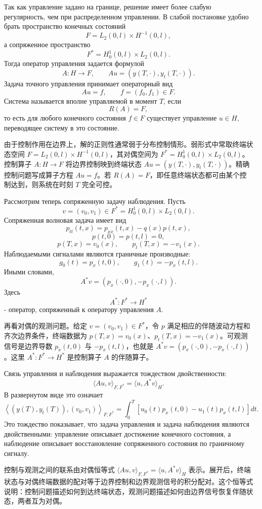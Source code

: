 \documentclass[12pt,a4paper]{article}
\newcommand{\zh}[1]{\par\noindent #1\par}
\begin{document}

Так как управление задано на границе, решение имеет более слабую регулярность, чем при распределенном управлении. В слабой постановке удобно брать пространство конечных состояний
\[
 F=L_2(0,l)\times H^{-1}(0,l),
\]
а сопряженное пространство
\[
 F^*=H_0^1(0,l)\times L_2(0,l).
\]
Тогда оператор управления задается формулой
\[
 A:H\to F,\qquad Au=(y(T,\cdot),y_t(T,\cdot)).
\]
Задача точного управления принимает операторный вид
\[
 Au=f,\qquad f=(f_0,f_1)\in F.
\]
Система называется вполне управляемой в момент $T$, если
\[
 R(A)=F,
\]
то есть для любого конечного состояния $f\in F$ существует управление $u\in H$, переводящее систему в это состояние.
\zh{由于控制作用在边界上，解的正则性通常弱于分布控制情形。弱形式中常取终端状态空间 \(F=L_2(0,l)\times H^{-1}(0,l)\)，其对偶空间为 \(F^*=H_0^1(0,l)\times L_2(0,l)\)。控制算子 \(A:H\to F\) 将边界控制映到终端状态 \(Au=(y(T,\cdot),y_t(T,\cdot))\)。精确控制问题写成算子方程 \(Au=f\)。若 \(R(A)=F\)，即任意终端状态都可由某个控制达到，则系统在时刻 \(T\) 完全可控。}

Рассмотрим теперь сопряженную задачу наблюдения. Пусть
\[
 v=(v_0,v_1)\in F^*=H_0^1(0,l)\times L_2(0,l).
\]
Сопряженная волновая задача имеет вид
\[
 p_{tt}(t,x)=p_{xx}(t,x)-q(x)p(t,x),
\]
\[
 p(t,0)=p(t,l)=0,
\]
\[
 p(T,x)=v_0(x),\qquad p_t(T,x)=-v_1(x).
\]
Наблюдаемыми сигналами являются граничные производные:
\[
 g_0(t)=p_x(t,0),\qquad g_1(t)=-p_x(t,l).
\]
Иными словами,
\[
 A^*v=(p_x(\cdot,0),-p_x(\cdot,l)).
\]
Здесь
\[
 A^*:F^*\to H^*
\]
- оператор, сопряженный к оператору управления $A$.
\zh{再看对偶的观测问题。给定 \(v=(v_0,v_1)\in F^*\)，令 \(p\) 满足相应的伴随波动方程和齐次边界条件，终端数据为 \(p(T,x)=v_0(x)\)、\(p_t(T,x)=-v_1(x)\)。可观测信号是边界导数 \(p_x(t,0)\) 与 \(-p_x(t,l)\)，也就是 \(A^*v=(p_x(\cdot,0),-p_x(\cdot,l))\)。这里 \(A^*:F^*\to H^*\) 是控制算子 \(A\) 的伴随算子。}


Связь управления и наблюдения выражается тождеством двойственности:
\[
 \langle Au,v\rangle_{F,F^*}=\langle u,A^*v\rangle_H.
\]
В развернутом виде это означает
\[
 \left\langle (y(T),y_t(T)),(v_0,v_1)\right\rangle_{F,F^*}
 =
 \int_0^T\left[u_0(t)p_x(t,0)-u_1(t)p_x(t,l)\right]dt.
\]
Это тождество показывает, что задача управления и задача наблюдения являются двойственными: управление описывает достижение конечного состояния, а наблюдение описывает восстановление сопряженного состояния по граничному сигналу.
\zh{控制与观测之间的联系由对偶恒等式 \(\langle Au,v\rangle_{F,F^*}=\langle u,A^*v\rangle_H\) 表示。展开后，终端状态与对偶终端数据的配对等于边界控制和边界观测信号的积分配对。这个恒等式说明：控制问题描述如何到达终端状态，观测问题描述如何由边界信号恢复伴随状态，两者互为对偶。}
\end{document}
